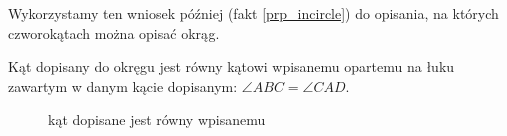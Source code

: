 Wykorzystamy ten wniosek później (fakt \ref{prp_incircle}) do opisania, na których czworokątach można opisać okrąg.

\begin{proposition}
    Kąt dopisany do okręgu jest równy kątowi wpisanemu opartemu na łuku zawartym w danym kącie dopisanym: $\angle ABC = \angle CAD$.
\begin{figure}[H] \centering
\begin{comment}
\begin{tikzpicture}[scale=.4]
    \tkzDefPoint(0, 0){Zero}
    \tkzDefPoint(50:5){A}
    \tkzDefPoint(230:5){B}
    \tkzDefPoint(300:5){C}
    \tkzDefLine[tangent at=A](Zero) \tkzGetPoint{DD}
    \tkzDefPointsBy[projection=onto A--DD](C){D}
    \tkzDrawCircle[line width=0.5mm](Zero,A)
    \tkzDrawLines[add= 1 and 1, line width=0.3mm](A,D)
    \tkzDrawPolygons[line width=0.3mm](A,B,C)
    \tkzMarkAngle[arc=l,size=1.2,mark=||](C,B,A)
    \tkzMarkAngle[arc=l,size=1.2,mark=||](C,A,D)
    \tkzDrawPoints[size=3,color=black,fill=black!50](A,B,C,D)
    \tkzLabelPoint[above left](Zero){$O$}
    \tkzLabelPoint[above right](A){$A$}
    \tkzLabelPoint[below left](B){$B$}
    \tkzLabelPoint[below right](C){$C$}
    \tkzLabelPoint[above right](D){$D$}
\end{tikzpicture}
\end{comment}
    \caption{kąt dopisane jest równy wpisanemu}
\end{figure}
\end{proposition}
